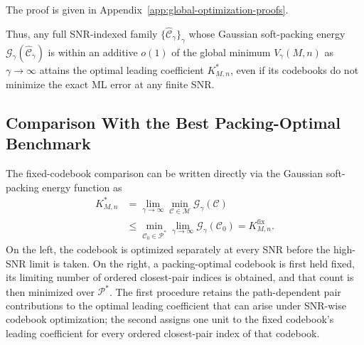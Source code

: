 \documentclass[12pt,draftclsnofoot,onecolumn]{IEEEtran}
\newcommand{\cC}{\mathcal{C}}
\newcommand{\cG}{\mathcal{G}}
\newcommand{\cM}{\mathcal{M}}
\newcommand{\cP}{\mathcal{P}}
\theoremstyle{definition}
\begin{document}
\begin{IEEEproof}
The proof is given in
Appendix~\ref{app:global-optimization-proofs}.
\end{IEEEproof}

Thus, any full SNR-indexed family
\(\{\widehat{\cC}_\gamma\}_\gamma\) whose Gaussian soft-packing energy
\(\cG_\gamma(\widehat{\cC}_\gamma)\) is within an additive \(o(1)\) of
the global minimum \(V_\gamma(M,n)\) as \(\gamma\to\infty\) attains the
optimal leading coefficient \(K^{\ast}_{M,n}\), even if its codebooks do
not minimize the exact ML error at any finite SNR.

\subsection{Comparison With the Best Packing-Optimal Benchmark}
The fixed-codebook comparison can be written directly via the Gaussian soft-packing energy function as
\begin{equation}
\begin{aligned}
  K^{\ast}_{M,n}
  &=
  \lim_{\gamma\to\infty}
  \min_{\cC\in\cM}\cG_\gamma(\cC)\\
  &\le
  \min_{\cC_0\in\cP^{\ast}}
  \lim_{\gamma\to\infty}\cG_\gamma(\cC_0)
  =K^{\mathrm{fix}}_{M,n}.
\end{aligned}
\label{eq:noncommuting-energy-limits}
\end{equation}
On the left, the codebook is optimized separately at every SNR before
the high-SNR limit is taken.  On the right, a packing-optimal codebook
is first held fixed, its limiting number of ordered closest-pair indices is obtained, and
that count is then minimized over \(\cP^{\ast}\).  The first procedure
retains the path-dependent pair contributions to the optimal leading
coefficient that can arise under SNR-wise codebook optimization; the second
assigns one unit to the fixed codebook's leading coefficient for every
ordered closest-pair index of that codebook.
\end{document}
